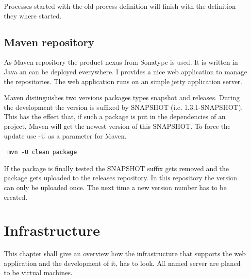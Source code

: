 \documentclass[paper=a4,twoside=false,BCOR=0mm,DIV=calc,fontsize=12pt]{scrartcl}
\begin{document}
Processes started with the old process definition will finish with the definition they where started.



\subsection{Maven repository}
As Maven repository the product nexus \cite{nexus} from Sonatype is used. It is written in Java an can be deployed everywhere. I provides a nice web application to manage the repositories. The web application runs on an simple jetty \cite{jetty} application server.

Maven distinguishes two versions packages types snapshot and releases.
During the development the version is suffixed by SNAPSHOT (i.e. 1.3.1-SNAPSHOT).
This has the effect that, if such a package is put in the dependencies of an project, Maven will get the newest version of this SNAPSHOT. To force the update use -U as a parameter for Maven.
\begin{verbatim}
 mvn -U clean package
\end{verbatim}

If the package is finally tested the SNAPSHOT suffix gets removed and the package gets uploaded to the releases repository. In this repository the version can only be uploaded once. The next time a new version number has to be created.

\section{Infrastructure}
This chapter shall give an overview how the infrastructure that supports the web application and the development of it, has to look. 
All named server are planed to be virtual machines.
\end{document}
